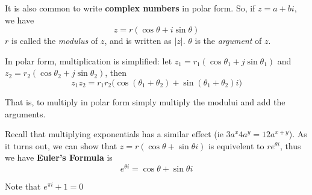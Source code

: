 \documentclass[12pt]{article}
\begin{document}
It is also common to write {\bf complex numbers} in polar form. So, if $z = a + bi$, we have \[ z = r(\cos\theta + i\sin\theta) \] $r$ is called the {\it modulus} of $z$, and is written as $|z|$. $\theta$ is the {\it argument} of $z$.

In polar form, multiplication is simplified: let $z_1 = r_1(\cos\theta_1 + j\sin\theta_1)$ and $z_2 = r_2(\cos\theta_2 + j\sin\theta_2)$, then \[ z_1z_2 = r_1r_2\bigl(\cos(\theta_1+\theta_2) + \sin(\theta_1+\theta_2)i\bigl) \]

That is, to multiply in polar form simply multiply the modului and add the arguments.

Recall that multiplying exponentials has a similar effect (ie $3a^x4a^y = 12a^{x+y}$). As it turns out, we can show that $z = r(\cos\theta + \sin\theta i)$ is equivelent to $re^{\theta i}$, thus we have {\bf Euler's Formula} is \[ e^{\theta i} = \cos\theta + \sin\theta i \]

Note that $e^{\pi i} + 1 = 0$
\end{document}
